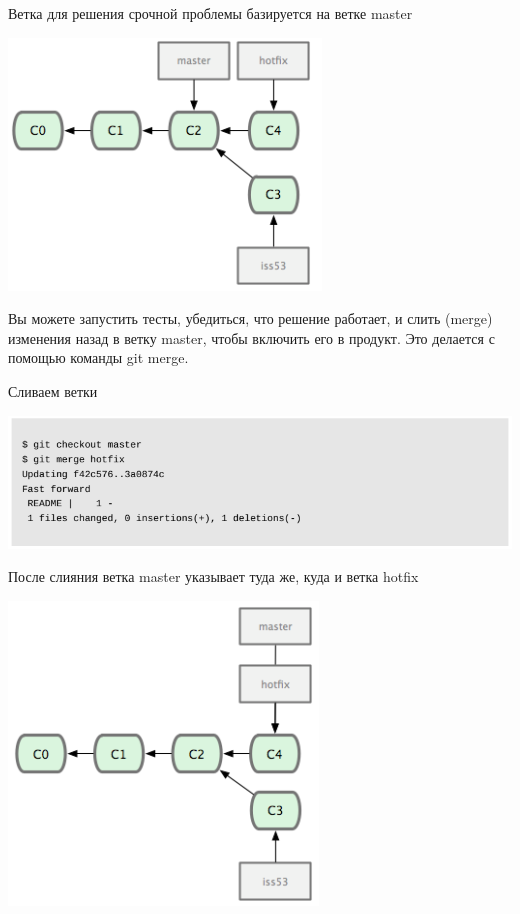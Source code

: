 \documentclass{beamer}
\begin{document}
\begin{frame}
\begin{block}{Ветка для решения срочной проблемы базируется на ветке master}
\begin{center}
\includegraphics[scale=0.5]{images/ex-10.png}
\end{center}
\end{block}

Вы можете запустить тесты, убедиться, что решение работает, и слить (merge) изменения
назад в ветку master, чтобы включить его в продукт. Это делается с помощью команды git
merge.
\end{frame}

\begin{frame}
\begin{block}{Сливаем ветки}
\begin{center}
\includegraphics[scale=0.5]{images/ex-11.png}
\end{center}
\end{block}
\begin{block}{После слияния ветка master указывает туда же, куда и ветка hotfix}
\begin{center}
\includegraphics[scale=0.5]{images/ex-12.png}
\end{center}
\end{block}
\end{frame}
\end{document}
